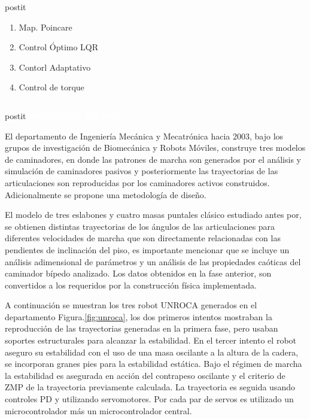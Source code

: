 {\begin{frame}
\begin{center}
{\begin{columns}[c]
\begin{column}{3cm}
\begin{beamercolorbox}[sep=0.5em,wd=3cm,rounded=true,center,shadow=true]{postit}
\begin{enumerate}
              \item Map. Poincare
              \item Control \'Optimo LQR
              \item Contorl Adaptativo
              \item Control de torque
              \end{enumerate}
            \end{beamercolorbox}
          \end{column}
        \end{columns}
        \vspace{-4.6cm}
        \hspace{-0.25cm}
        \begin{beamercolorbox}[sep=0.5em,wd=4.0cm,rounded=true,center]{postit}
          \textbf{\Large\textcolor{white}{ROB\'OTICA B\'IPEDA}}
        \end{beamercolorbox}
      }
    \end{center}
  \end{frame}
}
El departamento de Ingenier\'ia Mec\'anica y Mecatr\'onica hacia 2003, bajo los grupos de investigaci\'on de Biomec\'anica y Robots M\'oviles, construye tres modelos de caminadores, en donde las patrones de marcha son generados por el an\'alisis y simulaci\'on de caminadores pasivos y posteriormente las trayectorias de las articulaciones son reproducidas por los caminadores activos construidos. Adicionalmente se propone una metodolog\'ia de dise\~no\cite{Heredia2007}.\par
El modelo de tres eslabones y cuatro masas puntales cl\'asico estudiado antes por\cite{McGeer1990a}, se obtienen distintas trayectorias de los \'angulos de las articulaciones para diferentes velocidades de marcha que son directamente relacionadas con las pendientes de inclinaci\'on del piso\cite{M2005}, es importante mencionar que se incluye un an\'alisis adimensional de parámetros y un an\'alisis de las propiedades ca\'oticas del caminador bípedo analizado\cite{M2005a}. Los datos obtenidos en la fase anterior, son convertidos a los requeridos por la construcci\'on f\'isica implementada.\par
A continuaci\'on se muestran los tres robot UNROCA generados en el departamento Figura.\ref{fig:unroca}, los dos primeros intentos mostraban la reproducci\'on de las trayectorias generadas en la primera fase, pero usaban soportes estructurales para alcanzar la estabilidad. En el tercer intento el robot aseguro su estabilidad con el uso de una masa oscilante a la altura de la cadera, se incorporan granes pies para la estabilidad est\'atica. Bajo el r\'egimen de marcha la estabilidad es asegurada en acci\'on del contrapeso oscilante y el criterio de ZMP de la trayectoria previamente calculada. La trayectoria es seguida usando controles PD y utilizando servomotores. Por cada par de servos es utilizado un microcontrolador m\'as un microcontrolador central\cite{M2005}.
